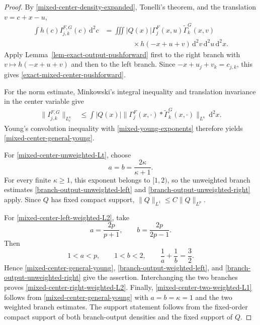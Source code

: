 \documentclass[a4paper,11pt]{article}
\newcommand{\dd}{\,\text{d}}
\theoremstyle{plain}
\theoremstyle{definition}
\theoremstyle{remark}
\begin{document}
\begin{proof}
By \eqref{mixed-center-density-expanded}, Tonelli's theorem, and the
translation $v=c+x-u$,
\begin{align*}
 \int h(c)I_{j,k}^{F,G}(c)\dd^2c
 &=\iiint |Q(x)|\Gamma_j^F(x,u)
       \widetilde\Gamma_k^G(x,v) \\
 &\qquad\qquad\times h(-x+u+v)
       \dd^2v\dd^2u\dd^2x.
\end{align*}
Apply Lemma~\ref{lem-exact-output-pushforward} first to the right branch with
$v\mapsto h(-x+u+v)$ and then to the left branch.  Since
$-x+u_j+v_k=c_{j,k}$, this gives
\eqref{exact-mixed-center-pushforward}.

For the norm estimate, Minkowski's integral inequality and translation
invariance in the center variable give
\begin{align*}
 \|I_{j,k}^{F,G}\|_{L^\kappa_c}
 &\le \int |Q(x)|
       \|\Gamma_j^F(x,\cdot)
          *\widetilde\Gamma_k^G(x,\cdot)\|_{L^\kappa}
       \dd^2x.
\end{align*}
Young's convolution inequality with
\eqref{mixed-young-exponents} therefore yields
\eqref{mixed-center-general-young}.

For \eqref{mixed-center-unweighted-Lt}, choose
\begin{equation}\label{mixed-unweighted-exponent-choice}
        a=b=\frac{2\kappa}{\kappa+1}.
\end{equation}
For every finite $\kappa\ge1$, this exponent belongs to $[1,2)$, so the unweighted
branch estimates \eqref{branch-output-unweighted-left} and
\eqref{branch-output-unweighted-right} apply.  Since $Q$ has fixed compact
support, $\|Q\|_{L^1}\le C\|Q\|_{L^p}$.

For \eqref{mixed-center-left-weighted-L2}, take
\begin{equation}\label{mixed-one-weight-exponent-choice}
        a=\frac{2p}{p+1},
        \qquad
        b=\frac{2p}{2p-1}.
\end{equation}
Then
\[
        1<a<p,
        \qquad
        1<b<2,
        \qquad
        \frac1a+\frac1b=\frac32.
\]
Hence \eqref{mixed-center-general-young},
\eqref{branch-output-weighted-left}, and
\eqref{branch-output-unweighted-right} give the assertion.  Interchanging the
two branches proves \eqref{mixed-center-right-weighted-L2}.  Finally,
\eqref{mixed-center-two-weighted-L1} follows from
\eqref{mixed-center-general-young} with $a=b=\kappa=1$ and the two weighted branch
estimates.  The support statement follows from the fixed-order compact support
of both branch-output densities and the fixed support of $Q$.
\end{proof}
\end{document}
